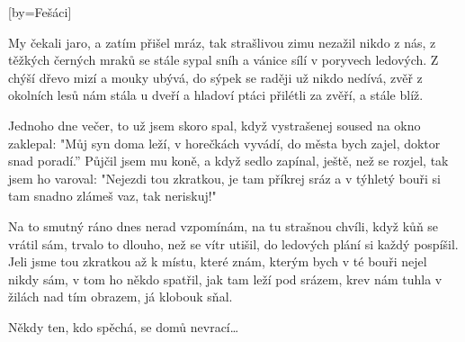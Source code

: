 [by={Fešáci}]

\beginverse{}
My čekali jaro, a zatím přišel mráz,
tak strašlivou zimu nezažil nikdo z nás,
z těžkých černých mraků se stále sypal sníh
a vánice sílí v poryvech ledových.
Z chýší dřevo mizí a mouky ubývá,
do sýpek se raději už nikdo nedívá,
zvěř z okolních lesů nám stála u dveří
a hladoví ptáci přilétli za zvěří, a stále blíž.
\endverse{}

\beginverse{}
Jednoho dne večer, to už jsem skoro spal,
když vystrašenej soused na okno zaklepal:
"Můj syn doma leží, v horečkách vyvádí,
do města bych zajel, doktor snad poradí.”
Půjčil jsem mu koně, a když sedlo zapínal,
ještě, než se rozjel, tak jsem ho varoval:
"Nejezdi tou zkratkou, je tam příkrej sráz
a v týhletý bouři si tam snadno zlámeš vaz, tak neriskuj!"
\endverse{}

\beginverse{}
Na to smutný ráno dnes nerad vzpomínám,
na tu strašnou chvíli, když kůň se vrátil sám,
trvalo to dlouho, než se vítr utišil,
do ledových plání si každý pospíšil.
Jeli jsme tou zkratkou až k místu, které znám,
kterým bych v té bouři nejel nikdy sám,
v tom ho někdo spatřil, jak tam leží pod srázem,
krev nám tuhla v žilách nad tím obrazem, já klobouk sňal.
\endverse{}

\beginverse*{}
Někdy ten, kdo spěchá, se domů nevrací\ldots{}
\endverse{}

\endsong{}
